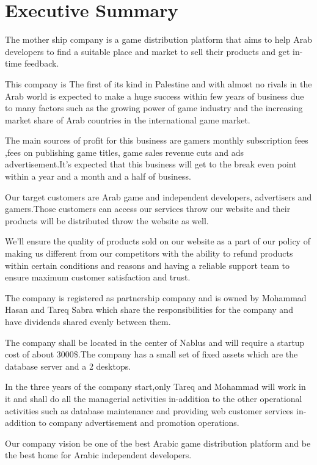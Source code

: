\documentclass[fontsize=14pt,svgnames]{scrreprt}
\begin{document}
	 
\tableofcontents
\listoftables
\listoffigures
\chapter{Executive Summary}
The mother ship company is a game distribution platform that aims to help Arab developers to find a suitable place and market to sell their products and get in-time feedback.
\par This company is The first of its kind in Palestine and with almost no rivals  in the Arab world  is expected to make a huge success within few years of business due  to many factors such as the growing power of game industry and the increasing market share of Arab countries in the international game market.
\par The main sources of profit for this business are gamers monthly subscription fees ,fees on publishing game titles, game sales revenue cuts and ads advertisement.It's expected that this business will get to the break even point within a year and a month and a half  of business.
\par Our target customers are Arab game and independent developers, advertisers and gamers.Those customers can access our services throw our website and their products will be distributed throw the website as well.
\par We’ll ensure the quality of products sold on our website as a part of our policy of making us different from our competitors with the ability to refund products within certain conditions and reasons  and having a reliable support team to ensure maximum customer satisfaction and trust. 
\par The company is registered as partnership company and is owned by Mohammad Hasan and Tareq Sabra which share the responsibilities for the company and have dividends shared evenly between them.
\par The company shall be located in the center of Nablus and will require a startup cost of about 3000\$.The company has a small set of fixed assets which are the database server and a 2 desktops.
\par In the three years of the company start,only Tareq and Mohammad will work in it and shall do all the managerial activities in-addition to the other operational activities such as database maintenance and providing web customer services in-addition to company advertisement and promotion operations.   
\par Our company vision be one of the best Arabic game distribution platform and be the best home for Arabic independent developers.
\end{document}
